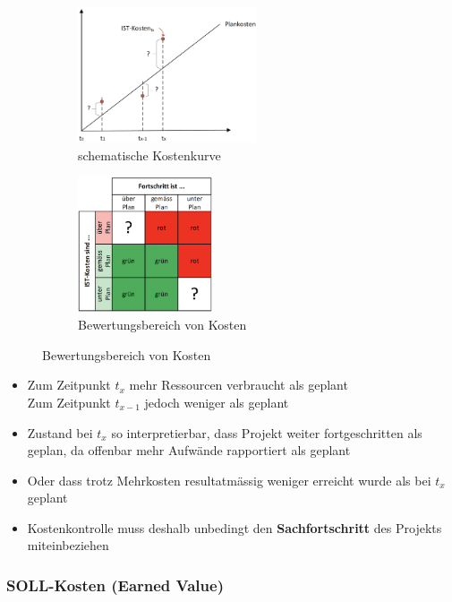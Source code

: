 \documentclass[a4paper]{article}
\begin{document}
		\begin{figure}[!htb]
			\centering
			\begin{subfigure}{.45\textwidth}
				\centering
				\includegraphics[height=4cm]{img/pm/kostenkurve.png}
				\caption{schematische Kostenkurve}
				\label{fig:pm_kostenkurve}
			\end{subfigure}
			\begin{subfigure}{.45\textwidth}
				\centering
				\includegraphics[height=4cm]{img/pm/kostenbewertung.png}
				\caption{Bewertungsbereich von Kosten}
				\label{fig:pm_kostenbewertung}
			\end{subfigure}
		\end{figure}
	
		\begin{itemize}
			\item Zum Zeitpunkt $t_x$ mehr Ressourcen verbraucht als geplant\\
			Zum Zeitpunkt $t_{x-1}$ jedoch weniger als geplant
			\item Zustand bei $t_x$ so interpretierbar, dass Projekt weiter fortgeschritten als geplan, da offenbar mehr Aufwände rapportiert als geplant
			\item Oder dass trotz Mehrkosten resultatmässig weniger erreicht wurde als bei $t_x$ geplant
			\item Kostenkontrolle muss deshalb unbedingt den \textbf{Sachfortschritt} des Projekts miteinbeziehen
		\end{itemize}
	
		\subsubsection{SOLL-Kosten (Earned Value)}
		
\end{document}
